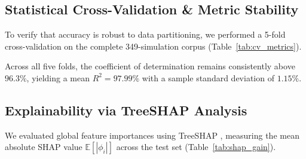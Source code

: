 \documentclass[journal]{IEEEtran}
\begin{document}
\subsection{Statistical Cross-Validation \& Metric Stability}
To verify that accuracy is robust to data partitioning, we performed a 5-fold cross-validation on the complete 349-simulation corpus (Table~\ref{tab:cv_metrics}).

\begin{table}[htbp]
\caption{5-Fold Cross-Validation Metrics on Rebuilt Total $\text{CO}_2$ Emissions}
\label{tab:cv_metrics}
\centering
{}
\end{table}

Across all five folds, the coefficient of determination remains consistently above $96.3\%$, yielding a mean $R^2 = 97.99\%$ with a sample standard deviation of $1.15\%$.

\subsection{Explainability via TreeSHAP Analysis}
We evaluated global feature importances using TreeSHAP \cite{Lundberg2020}, measuring the mean absolute SHAP value $\mathbb{E}[|\phi_i|]$ across the test set (Table~\ref{tab:shap_gain}).
\end{document}
